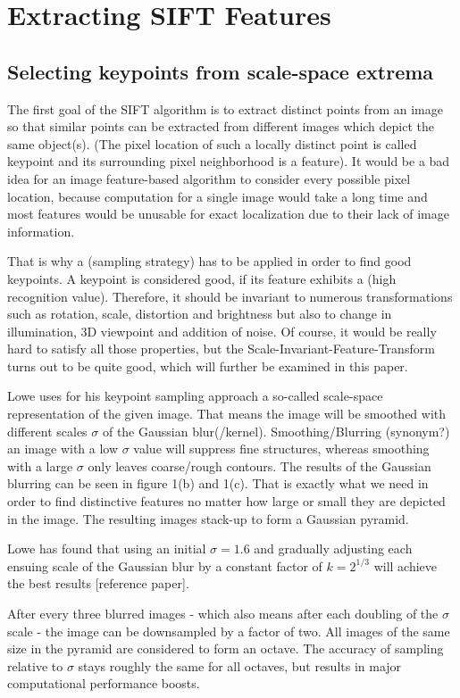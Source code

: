 \documentclass{article}
\begin{document}
	\section{Extracting SIFT Features}		
	\subsection{Selecting keypoints from scale-space extrema}
	
	The first goal of the SIFT algorithm is to extract distinct points from an image so that similar points can be extracted from different images which depict the same object(s). 
	(The pixel location of such a locally distinct point is called keypoint and its surrounding pixel neighborhood is a feature). It would be a bad idea for an image feature-based algorithm to consider every possible pixel location, because computation for a single image would take a long time and most features would be unusable for exact localization due to their lack of image information. 
	
	That is why a (sampling strategy) has to be applied in order to find good keypoints. A keypoint is considered good, if its feature exhibits a (high recognition value). Therefore, it should be invariant to numerous transformations such as rotation, scale, distortion and brightness but also to change in illumination, 3D viewpoint and addition of noise. Of course, it would be really hard to satisfy all those properties, but the Scale-Invariant-Feature-Transform turns out to be quite good, which will further be examined in this paper.
	
	Lowe uses for his keypoint sampling approach a so-called scale-space representation of the given image. That means the image will be smoothed with different scales $\sigma$ of the Gaussian blur(/kernel). Smoothing/Blurring (synonym?) an image with a low $\sigma$ value will suppress fine structures, whereas smoothing with a large $\sigma$ only leaves coarse/rough contours. The results of the Gaussian blurring can be seen in figure 1(b) and 1(c). That is exactly what we need in order to find distinctive features no matter how large or small they are depicted in the image. The resulting images stack-up to form a Gaussian pyramid.
	
	Lowe has found that using an initial $\sigma = 1.6$ and gradually adjusting each ensuing scale of the Gaussian blur by a constant factor of $k = 2^{1/3}$ will achieve the best results [reference paper].
	
	After every three blurred images - which also means after each doubling of the $\sigma$ scale - the image can be downsampled by a factor of two. All images of the same size in the pyramid are considered to form an octave. The accuracy of sampling relative to $\sigma$ stays roughly the same for all octaves, but results in major computational performance boosts.
	
\end{document}
